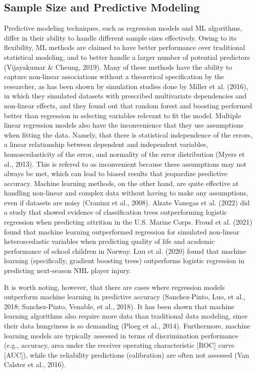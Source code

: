 \documentclass[
  man]{apa7}
\begin{document}
\subsection{Sample Size and Predictive Modeling}\label{sample-size-and-predictive-modeling}

Predictive modeling techniques, such as regression models and ML algorithms, differ in their ability to handle different sample sizes effectively.
Owing to its flexibility, ML methods are claimed to have better performance over traditional statistical modeling, and to better handle a larger number of potential predictors (Vijayakumar \& Cheung, 2019).
Many of these methods have the ability to capture non-linear associations without a theoretical specification by the researcher, as has been shown by simulation studies done by Miller et al. (2016), in which they simulated datasets with prescribed multivariate dependencies and non-linear effects, and they found out that random forest and boosting performed better than regression in selecting variables relevant to fit the model.
Multiple linear regression models also have the inconvenience that they use assumptions when fitting the data.
Namely, that there is statistical independence of the errors, a linear relationship between dependent and independent variables, homoscedasticity of the error, and normality of the error distribution (Myers et al., 2013).
This is refered to as inconvenient because these assumptions may not always be met, which can lead to biased results that jeopardize predictive accuracy.
Machine learning methods, on the other hand, are quite effective at handling non-linear and complex data without having to make any assumptions, even if datasets are noisy (Craninx et al., 2008).
Alzate Vanegas et al. (2022) did a study that showed evidence of classification trees outperforming logistic regression when predicting attrition in the U.S.
Marine Corps.
Froud et al. (2021) found that machine learning outperformed regression for simulated non-linear heteroscedastic variables when predicting quality of life and academic performance of school children in Norway.
Luu et al. (2020) found that machine learning (specifically, gradient boosting trees) outperforms logistic regression in predicting next-season NHL player injury.

It is worth noting, however, that there are cases where regression models outperform machine learning in predictive accuracy (Sanchez-Pinto, Luo, et al., 2018; Sanchez-Pinto, Venable, et al., 2018). It has been shown that machine learning algorithms also require more data than traditional data modeling, since their data hungriness is so demanding (Ploeg et al., 2014).
Furthermore, machine learning models are typically assessed in terms of discrimination performance (e.g., accuracy, area under the receiver operating characteristic {[}ROC{]} curve {[}AUC{]}), while the reliability predictions (calibration) are often not assessed (Van Calster et al., 2016).
\end{document}
